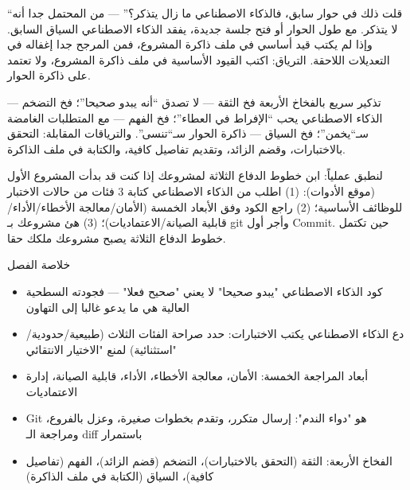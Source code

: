 
“قلت ذلك في حوار سابق، فالذكاء الاصطناعي ما زال يتذكر؟” — من المحتمل جدا أنه لا يتذكر. مع طول الحوار أو فتح جلسة جديدة، يفقد الذكاء الاصطناعي السياق السابق. وإذا لم يكتب قيد أساسي في ملف ذاكرة المشروع، فمن المرجح جدا إغفاله في التعديلات اللاحقة. الترياق: اكتب القيود الأساسية في ملف ذاكرة المشروع، ولا تعتمد على ذاكرة الحوار.

\begin{tcbwarn}{تذكير سريع بالفخاخ الأربعة}
فخ الثقة — لا تصدق “أنه يبدو صحيحا”؛ فخ التضخم — الذكاء الاصطناعي يحب “الإفراط في العطاء”؛ فخ الفهم — مع المتطلبات الغامضة سـ“يخمن”؛ فخ السياق — ذاكرة الحوار سـ“تنسى”. والترياقات المقابلة: التحقق بالاختبارات، وقضم الزائد، وتقديم تفاصيل كافية، والكتابة في ملف الذاكرة.

\end{tcbwarn}

\begin{tcbpractice}{لنطبق عملياً: ابن خطوط الدفاع الثلاثة لمشروعك}
إذا كنت قد بدأت المشروع الأول (موقع الأدوات): (1) اطلب من الذكاء الاصطناعي كتابة 3 فئات من حالات الاختبار للوظائف الأساسية؛ (2) راجع الكود وفق الأبعاد الخمسة (الأمان/معالجة الأخطاء/الأداء/قابلية الصيانة/الاعتماديات)؛ (3) هئ مشروعك بـ git وأجر أول Commit. حين تكتمل خطوط الدفاع الثلاثة يصبح مشروعك ملكك حقا.

\end{tcbpractice}

\begin{tcbsummary}{خلاصة الفصل}
\begin{itemize}
  \item كود الذكاء الاصطناعي "يبدو صحيحا" لا يعني "صحيح فعلا" — فجودته السطحية العالية هي ما يدعو غالبا إلى التهاون
  \item دع الذكاء الاصطناعي يكتب الاختبارات: حدد صراحة الفئات الثلاث (طبيعية/حدودية/استثنائية) لمنع "الاختيار الانتقائي"
  \item أبعاد المراجعة الخمسة: الأمان، معالجة الأخطاء، الأداء، قابلية الصيانة، إدارة الاعتماديات
  \item Git هو "دواء الندم": إرسال متكرر، وتقدم بخطوات صغيرة، وعزل بالفروع، ومراجعة الـ diff باستمرار
  \item الفخاخ الأربعة: الثقة (التحقق بالاختبارات)، التضخم (قضم الزائد)، الفهم (تفاصيل كافية)، السياق (الكتابة في ملف الذاكرة)
\end{itemize}

\end{tcbsummary}
